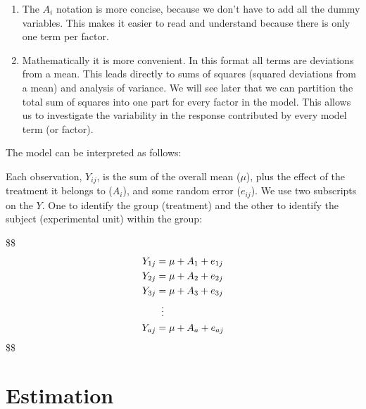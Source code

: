 \documentclass[
  letterpaper,
]{book}
\begin{document}
\begin{tcolorbox}
\begin{enumerate}
\def\labelenumi{\arabic{enumi}.}
\item
  The \(A_i\) notation is more concise, because we don't have to add all
  the dummy variables. This makes it easier to read and understand
  because there is only one term per factor.
\item
  Mathematically it is more convenient. In this format all terms are
  deviations from a mean. This leads directly to sums of
  squares\footnotemark{} (squared deviations from a mean) and analysis
  of variance. We will see later that we can partition the total sum of
  squares into one part for every factor in the model. This allows us to
  investigate the variability in the response contributed by every model
  term (or factor).
\end{enumerate}

\end{tcolorbox}


The model can be interpreted as follows:

Each observation, \(Y_{ij}\), is the sum of the overall mean (\(\mu\)),
plus the effect of the treatment it belongs to (\(A_i\)), and some
random error (\(e_{ij}\)). We use two subscripts on the \(Y\). One to
identify the group (treatment) and the other to identify the subject
(experimental unit) within the group:

\$\$ \begin{equation}
\begin{aligned}
Y_{1j} &= \mu + A_1 + e_{1j} \\ 
Y_{2j} &= \mu + A_2 + e_{2j} \\ 
Y_{3j} &= \mu + A_3 + e_{3j} \\

&\;\;\vdots \notag \\
Y_{aj} &= \mu + A_a + e_{aj} \\
\end{aligned}
\end{equation} \$\$

\section{Estimation}\label{estimation}
\end{document}
